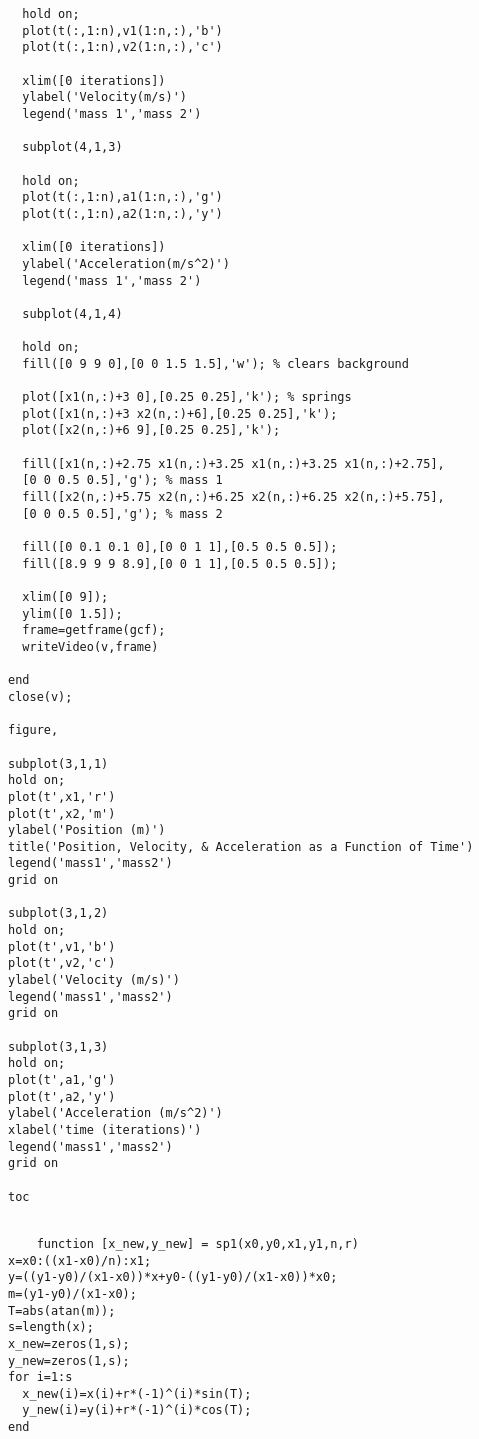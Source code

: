 \begin{framed}
\begin{verbatim}
  hold on;
  plot(t(:,1:n),v1(1:n,:),'b')
  plot(t(:,1:n),v2(1:n,:),'c')
 
  xlim([0 iterations])
  ylabel('Velocity(m/s)')
  legend('mass 1','mass 2')
  
  subplot(4,1,3)
  
  hold on;
  plot(t(:,1:n),a1(1:n,:),'g')
  plot(t(:,1:n),a2(1:n,:),'y')
 
  xlim([0 iterations])
  ylabel('Acceleration(m/s^2)')
  legend('mass 1','mass 2')
  
  subplot(4,1,4)
  
  hold on;
  fill([0 9 9 0],[0 0 1.5 1.5],'w'); % clears background
  
  plot([x1(n,:)+3 0],[0.25 0.25],'k'); % springs
  plot([x1(n,:)+3 x2(n,:)+6],[0.25 0.25],'k');
  plot([x2(n,:)+6 9],[0.25 0.25],'k');
  
  fill([x1(n,:)+2.75 x1(n,:)+3.25 x1(n,:)+3.25 x1(n,:)+2.75],
  [0 0 0.5 0.5],'g'); % mass 1
  fill([x2(n,:)+5.75 x2(n,:)+6.25 x2(n,:)+6.25 x2(n,:)+5.75],
  [0 0 0.5 0.5],'g'); % mass 2
  
  fill([0 0.1 0.1 0],[0 0 1 1],[0.5 0.5 0.5]);
  fill([8.9 9 9 8.9],[0 0 1 1],[0.5 0.5 0.5]);

  xlim([0 9]);
  ylim([0 1.5]);
  frame=getframe(gcf);
  writeVideo(v,frame)
  
end
close(v);

figure,

subplot(3,1,1)
hold on;
plot(t',x1,'r')
plot(t',x2,'m')
ylabel('Position (m)')
title('Position, Velocity, & Acceleration as a Function of Time')
legend('mass1','mass2')
grid on

subplot(3,1,2)
hold on;
plot(t',v1,'b')
plot(t',v2,'c')
ylabel('Velocity (m/s)')
legend('mass1','mass2')
grid on

subplot(3,1,3)
hold on;
plot(t',a1,'g')
plot(t',a2,'y')
ylabel('Acceleration (m/s^2)')
xlabel('time (iterations)')
legend('mass1','mass2')
grid on

toc


\end{verbatim}
\end{framed}

\begin{framed}
\begin{verbatim}
    function [x_new,y_new] = sp1(x0,y0,x1,y1,n,r)
x=x0:((x1-x0)/n):x1;
y=((y1-y0)/(x1-x0))*x+y0-((y1-y0)/(x1-x0))*x0;
m=(y1-y0)/(x1-x0);
T=abs(atan(m));
s=length(x);
x_new=zeros(1,s);
y_new=zeros(1,s);
for i=1:s
  x_new(i)=x(i)+r*(-1)^(i)*sin(T);
  y_new(i)=y(i)+r*(-1)^(i)*cos(T);
end
\end{verbatim}
\end{framed}


